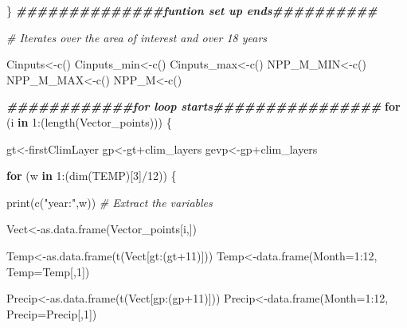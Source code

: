 \documentclass[
  10pt,
  b5paper,
]{book}
\newenvironment{Shaded}{\begin{snugshade}}{\end{snugshade}}
\newcommand{\AttributeTok}[1]{\textcolor[rgb]{0.77,0.63,0.00}{#1}}
\newcommand{\CommentTok}[1]{\textcolor[rgb]{0.56,0.35,0.01}{\textit{#1}}}
\newcommand{\ControlFlowTok}[1]{\textcolor[rgb]{0.13,0.29,0.53}{\textbf{#1}}}
\newcommand{\DecValTok}[1]{\textcolor[rgb]{0.00,0.00,0.81}{#1}}
\newcommand{\DocumentationTok}[1]{\textcolor[rgb]{0.56,0.35,0.01}{\textbf{\textit{#1}}}}
\newcommand{\FunctionTok}[1]{\textcolor[rgb]{0.00,0.00,0.00}{#1}}
\newcommand{\NormalTok}[1]{#1}
\newcommand{\OtherTok}[1]{\textcolor[rgb]{0.56,0.35,0.01}{#1}}
\newcommand{\SpecialCharTok}[1]{\textcolor[rgb]{0.00,0.00,0.00}{#1}}
\newcommand{\StringTok}[1]{\textcolor[rgb]{0.31,0.60,0.02}{#1}}
\begin{document}
\begin{Shaded}
\begin{Highlighting}[]
\NormalTok{\}}
\DocumentationTok{\#\#\#\#\#\#\#\#\#\#\#\#\#\#funtion set up ends\#\#\#\#\#\#\#\#\#\#}

\CommentTok{\# Iterates over the area of interest and over 18 years }

\NormalTok{Cinputs}\OtherTok{\textless{}{-}}\FunctionTok{c}\NormalTok{()}
\NormalTok{Cinputs\_min}\OtherTok{\textless{}{-}}\FunctionTok{c}\NormalTok{()}
\NormalTok{Cinputs\_max}\OtherTok{\textless{}{-}}\FunctionTok{c}\NormalTok{()}
\NormalTok{NPP\_M\_MIN}\OtherTok{\textless{}{-}}\FunctionTok{c}\NormalTok{()}
\NormalTok{NPP\_M\_MAX}\OtherTok{\textless{}{-}}\FunctionTok{c}\NormalTok{()}
\NormalTok{NPP\_M}\OtherTok{\textless{}{-}}\FunctionTok{c}\NormalTok{()}

\DocumentationTok{\#\#\#\#\#\#\#\#\#\#\#\#for loop starts\#\#\#\#\#\#\#\#\#\#\#\#\#\#\#\#}
\ControlFlowTok{for}\NormalTok{ (i }\ControlFlowTok{in} \DecValTok{1}\SpecialCharTok{:}\NormalTok{(}\FunctionTok{length}\NormalTok{(Vector\_points))) \{}

\NormalTok{gt}\OtherTok{\textless{}{-}}\NormalTok{firstClimLayer}
\NormalTok{gp}\OtherTok{\textless{}{-}}\NormalTok{gt}\SpecialCharTok{+}\NormalTok{clim\_layers}
\NormalTok{gevp}\OtherTok{\textless{}{-}}\NormalTok{gp}\SpecialCharTok{+}\NormalTok{clim\_layers}

\ControlFlowTok{for}\NormalTok{ (w }\ControlFlowTok{in} \DecValTok{1}\SpecialCharTok{:}\NormalTok{(}\FunctionTok{dim}\NormalTok{(TEMP)[}\DecValTok{3}\NormalTok{]}\SpecialCharTok{/}\DecValTok{12}\NormalTok{)) \{}

\FunctionTok{print}\NormalTok{(}\FunctionTok{c}\NormalTok{(}\StringTok{"year:"}\NormalTok{,w))}
\CommentTok{\# Extract the variables }

\NormalTok{Vect}\OtherTok{\textless{}{-}}\FunctionTok{as.data.frame}\NormalTok{(Vector\_points[i,])}

\NormalTok{Temp}\OtherTok{\textless{}{-}}\FunctionTok{as.data.frame}\NormalTok{(}\FunctionTok{t}\NormalTok{(Vect[gt}\SpecialCharTok{:}\NormalTok{(gt}\SpecialCharTok{+}\DecValTok{11}\NormalTok{)]))}
\NormalTok{Temp}\OtherTok{\textless{}{-}}\FunctionTok{data.frame}\NormalTok{(}\AttributeTok{Month=}\DecValTok{1}\SpecialCharTok{:}\DecValTok{12}\NormalTok{, }\AttributeTok{Temp=}\NormalTok{Temp[,}\DecValTok{1}\NormalTok{])}

\NormalTok{Precip}\OtherTok{\textless{}{-}}\FunctionTok{as.data.frame}\NormalTok{(}\FunctionTok{t}\NormalTok{(Vect[gp}\SpecialCharTok{:}\NormalTok{(gp}\SpecialCharTok{+}\DecValTok{11}\NormalTok{)]))}
\NormalTok{Precip}\OtherTok{\textless{}{-}}\FunctionTok{data.frame}\NormalTok{(}\AttributeTok{Month=}\DecValTok{1}\SpecialCharTok{:}\DecValTok{12}\NormalTok{, }\AttributeTok{Precip=}\NormalTok{Precip[,}\DecValTok{1}\NormalTok{])}


\end{Highlighting}
\end{Shaded}
\end{document}
